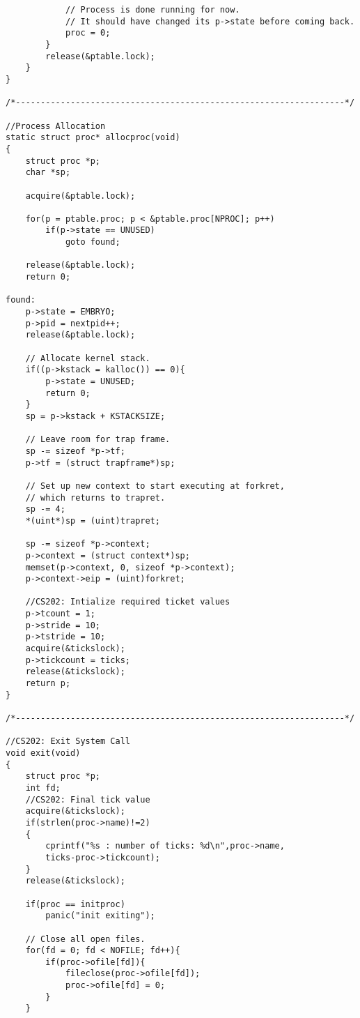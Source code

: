 \documentclass[a4paper, 10pt]{article}
\begin{document}
\begin{lstlisting}
            // Process is done running for now.
            // It should have changed its p->state before coming back.
            proc = 0;
        }
        release(&ptable.lock);
    }
}

/*------------------------------------------------------------------*/

//Process Allocation
static struct proc* allocproc(void)
{
    struct proc *p;
    char *sp;

    acquire(&ptable.lock);

    for(p = ptable.proc; p < &ptable.proc[NPROC]; p++)
        if(p->state == UNUSED)
            goto found;

    release(&ptable.lock);
    return 0;

found:
    p->state = EMBRYO;
    p->pid = nextpid++;
    release(&ptable.lock);
  
    // Allocate kernel stack.
    if((p->kstack = kalloc()) == 0){
        p->state = UNUSED;
        return 0;
    }
    sp = p->kstack + KSTACKSIZE;
  
    // Leave room for trap frame.
    sp -= sizeof *p->tf;
    p->tf = (struct trapframe*)sp;
  
    // Set up new context to start executing at forkret,
    // which returns to trapret.
    sp -= 4;
    *(uint*)sp = (uint)trapret;

    sp -= sizeof *p->context;
    p->context = (struct context*)sp;
    memset(p->context, 0, sizeof *p->context);
    p->context->eip = (uint)forkret;

    //CS202: Intialize required ticket values
    p->tcount = 1;
    p->stride = 10;
    p->tstride = 10;
    acquire(&tickslock);
    p->tickcount = ticks;
    release(&tickslock);
    return p;
}

/*------------------------------------------------------------------*/

//CS202: Exit System Call
void exit(void)
{
    struct proc *p;
    int fd;
    //CS202: Final tick value
    acquire(&tickslock);
    if(strlen(proc->name)!=2)
    { 
        cprintf("%s : number of ticks: %d\n",proc->name,
        ticks-proc->tickcount);
    }
    release(&tickslock);
    
    if(proc == initproc)
        panic("init exiting");

    // Close all open files.
    for(fd = 0; fd < NOFILE; fd++){
        if(proc->ofile[fd]){
            fileclose(proc->ofile[fd]);
            proc->ofile[fd] = 0;
        }
    }


\end{lstlisting}
\end{document}

